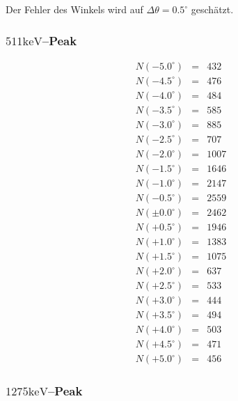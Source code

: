 \documentclass[12pt,a4paper]{scrartcl}
\numberwithin{equation}{section} %
\newcommand{\pu}[1]{\ensuremath{\mathrm{#1}}}
\renewcommand{\[}{} %
\renewcommand{\]}{\noindent} %
\begin{document}
Der Fehler des Winkels wird auf \(\Delta \theta = \pu{0.5^\circ}\)
geschätzt.

\hypertarget{pu511kevpeak}{%
\subsubsection{\texorpdfstring{\(\pu{511keV}\)--Peak}{\textbackslash pu\{511keV\}--Peak}}\label{pu511kevpeak}}

\[
\begin{eqnarray*}
    N(-5.0^\circ) &=& 432 \\
    N(-4.5^\circ) &=& 476 \\
    N(-4.0^\circ) &=& 484 \\
    N(-3.5^\circ) &=& 585 \\
    N(-3.0^\circ) &=& 885 \\
    N(-2.5^\circ) &=& 707 \\
    N(-2.0^\circ) &=& 1007 \\
    N(-1.5^\circ) &=& 1646 \\
    N(-1.0^\circ) &=& 2147 \\
    N(-0.5^\circ) &=& 2559 \\
    N(\pm0.0^\circ) &=& 2462 \\
    N(+0.5^\circ) &=& 1946 \\
    N(+1.0^\circ) &=& 1383 \\
    N(+1.5^\circ) &=& 1075 \\
    N(+2.0^\circ) &=& 637 \\
    N(+2.5^\circ) &=& 533 \\
    N(+3.0^\circ) &=& 444 \\
    N(+3.5^\circ) &=& 494 \\
    N(+4.0^\circ) &=& 503 \\
    N(+4.5^\circ) &=& 471 \\
    N(+5.0^\circ) &=& 456
\end{eqnarray*}
\]

\hypertarget{pu1275kevpeak}{%
\subsubsection{\texorpdfstring{\(\pu{1275keV}\)--Peak}{\textbackslash pu\{1275keV\}--Peak}}\label{pu1275kevpeak}}
\end{document}
